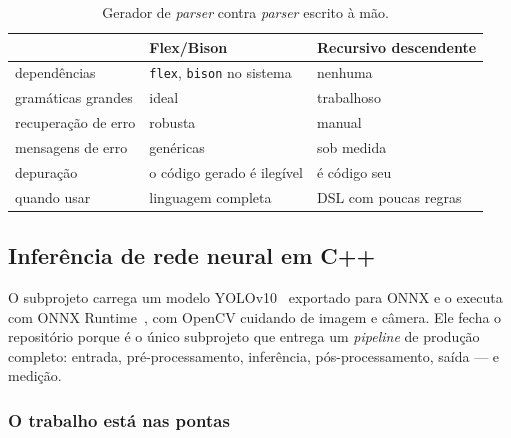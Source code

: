 \begin{table}[htbp]
\centering
\caption{Gerador de \emph{parser} contra \emph{parser} escrito à mão.}
\label{tab:parser-escolha}
\footnotesize
\begin{tabular}{@{}lll@{}}
\toprule
 & \textbf{Flex/Bison} & \textbf{Recursivo descendente} \\
\midrule
dependências        & \texttt{flex}, \texttt{bison} no sistema & nenhuma \\
gramáticas grandes  & ideal                     & trabalhoso \\
recuperação de erro & robusta                   & manual \\
mensagens de erro   & genéricas                 & sob medida \\
depuração           & o código gerado é ilegível& é código seu \\
quando usar         & linguagem completa        & DSL com poucas regras \\
\bottomrule
\end{tabular}
\end{table}

\subsection{Inferência de rede neural em C++}
\label{sec:yolo}

O subprojeto  carrega um modelo YOLOv10~\cite{yolov10} exportado
para ONNX e o executa com ONNX Runtime~\cite{onnxruntime}, com OpenCV cuidando
de imagem e câmera. Ele fecha o repositório porque é o único subprojeto que
entrega um \emph{pipeline} de produção completo: entrada, pré-processamento,
inferência, pós-processamento, saída --- e medição.

\subsubsection{O trabalho está nas pontas}

